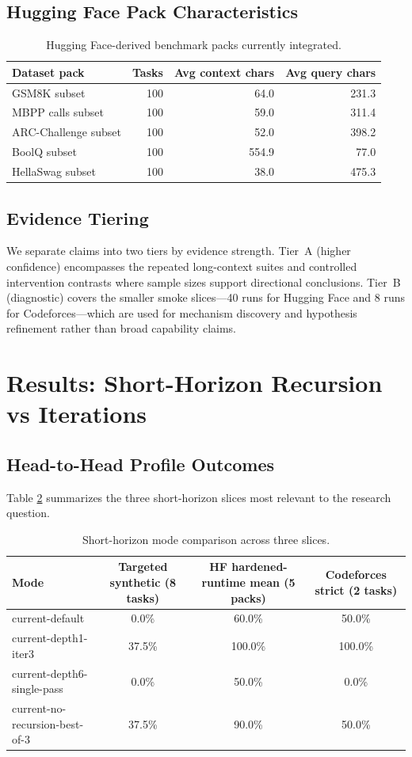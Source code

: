 \documentclass[11pt]{article}
\begin{document}
\subsection{Hugging Face Pack Characteristics}
\begin{table}[h]
\centering
\caption{Hugging Face-derived benchmark packs currently integrated.}
\label{tab:hf-packs}
\begin{tabular}{lrrr}
\toprule
Dataset pack & Tasks & Avg context chars & Avg query chars \\
\midrule
GSM8K subset & 100 & 64.0 & 231.3 \\
MBPP calls subset & 100 & 59.0 & 311.4 \\
ARC-Challenge subset & 100 & 52.0 & 398.2 \\
BoolQ subset & 100 & 554.9 & 77.0 \\
HellaSwag subset & 100 & 38.0 & 475.3 \\
\bottomrule
\end{tabular}
\end{table}

\subsection{Evidence Tiering}
We separate claims into two tiers by evidence strength. Tier~A (higher confidence) encompasses the repeated long-context suites and controlled intervention contrasts where sample sizes support directional conclusions. Tier~B (diagnostic) covers the smaller smoke slices---40 runs for Hugging Face and 8 runs for Codeforces---which are used for mechanism discovery and hypothesis refinement rather than broad capability claims.

\section{Results: Short-Horizon Recursion vs Iterations}
\subsection{Head-to-Head Profile Outcomes}
Table \ref{tab:sh-core} summarizes the three short-horizon slices most relevant to the research question.

\begin{table}[t]
\centering
\caption{Short-horizon mode comparison across three slices.}
\label{tab:sh-core}
\begin{tabular}{lccc}
\toprule
Mode & Targeted synthetic (8 tasks) & HF hardened-runtime mean (5 packs) & Codeforces strict (2 tasks) \\
\midrule
current-default & 0.0\% & 60.0\% & 50.0\% \\
current-depth1-iter3 & 37.5\% & 100.0\% & 100.0\% \\
current-depth6-single-pass & 0.0\% & 50.0\% & 0.0\% \\
current-no-recursion-best-of-3 & 37.5\% & 90.0\% & 50.0\% \\
\bottomrule
\end{tabular}
\end{table}
\end{document}
